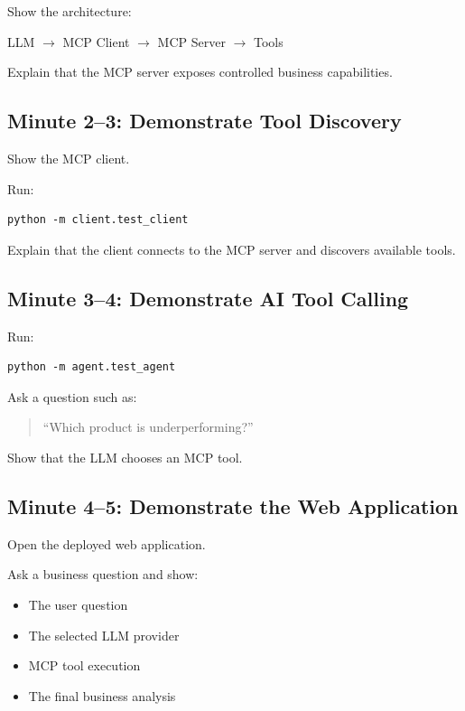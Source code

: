\documentclass[11pt,a4paper]{article}
\begin{document}
Show the architecture:

\begin{center}
LLM $\rightarrow$ MCP Client $\rightarrow$ MCP Server $\rightarrow$ Tools
\end{center}

Explain that the MCP server exposes controlled business capabilities.

\subsection{Minute 2--3: Demonstrate Tool Discovery}

Show the MCP client.

Run:

\begin{lstlisting}[style=terminal]
python -m client.test_client
\end{lstlisting}

Explain that the client connects to the MCP server and discovers
available tools.

\subsection{Minute 3--4: Demonstrate AI Tool Calling}

Run:

\begin{lstlisting}[style=terminal]
python -m agent.test_agent
\end{lstlisting}

Ask a question such as:

\begin{quote}
``Which product is underperforming?''
\end{quote}

Show that the LLM chooses an MCP tool.

\subsection{Minute 4--5: Demonstrate the Web Application}

Open the deployed web application.

Ask a business question and show:

\begin{itemize}
\item The user question
\item The selected LLM provider
\item MCP tool execution
\item The final business analysis
\end{itemize}
\end{document}

